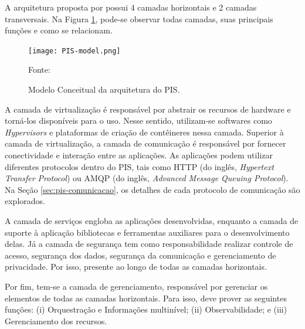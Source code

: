 A arquitetura proposta por  possui 4 camadas horizontais e 2 camadas transversais. Na Figura \ref{fig:pis-model-conceitual}, pode-se observar todas camadas, suas principais funções e como se relacionam.

\begin{figure}[ht]
    \centering
    \texttt{[image: PIS-model.png]}
    \caption{Modelo Conceitual da arquitetura do PIS.}
    \footnotesize Fonte: 
    \label{fig:pis-model-conceitual}
\end{figure}

A camada de virtualização é responsável por abstrair os recursos de hardware e torná-los disponíveis para o uso. Nesse sentido, utilizam-se softwares como \textit{Hypervisors} e plataformas de criação de contêineres nessa camada. Superior à camada de virtualização, a camada de comunicação é responsável por fornecer conectividade e interação entre as aplicações. As aplicações podem utilizar diferentes protocolos dentro do PIS, tais como HTTP (do inglês, \textit{Hypertext Transfer Protocol}) ou AMQP (do inglês, \textit{Advanced Message Queuing Protocol}). Na Seção \ref{sec:pis-comunicacao}, os detalhes de cada protocolo de comunicação são explorados.

A camada de serviços engloba as aplicações desenvolvidas, enquanto a camada de suporte à aplicação  bibliotecas e ferramentas auxiliares para o desenvolvimento delas. Já a camada de segurança tem como responsabilidade realizar controle de acesso, segurança dos dados, segurança da comunicação e gerenciamento de privacidade. Por isso,  presente ao longo de todas as  camadas horizontais.

Por fim, tem-se a camada de gerenciamento, responsável por gerenciar os elementos de todas as  camadas horizontais. Para isso, deve prover as seguintes funções: (i) Orquestração e Informações multinível; (ii) Observabilidade; e (iii) Gerenciamento dos recursos. 


    
